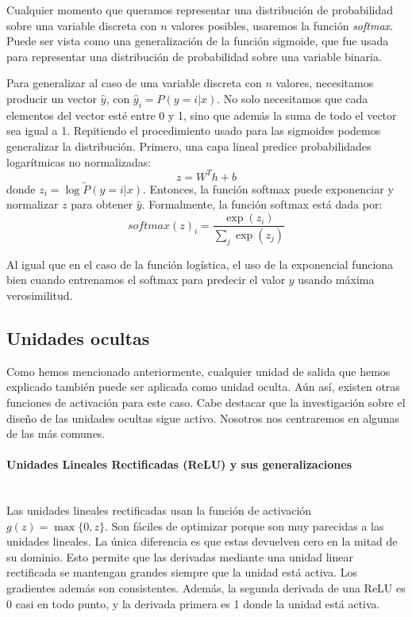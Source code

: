 Cualquier momento que queramos representar una distribución de probabilidad sobre una variable discreta con $n$ valores posibles, usaremos la función \textit{softmax}. Puede ser vista como una generalización de la función sigmoide, que fue usada para representar una distribución de probabilidad sobre una variable binaria.

Para generalizar al caso de una variable discreta con $n$ valores, necesitamos producir un vector $\hat{y}$, con $\hat{y}_i=P(y=i|x)$. No solo necesitamos que cada elementos del vector esté entre 0 y 1, sino que además la suma de todo el vector sea igual a 1. Repitiendo el procedimiento usado para las sigmoides podemos generalizar la distribución. Primero, una capa lineal predice probabilidades logarítmicas no normalizadas:
\begin{equation}
    z = W^Th+b
\end{equation}
donde $z_i = \log \tilde{P}(y=i|x)$. Entonces, la función softmax puede exponenciar y normalizar $z$ para obtener $\hat{y}$. Formalmente, la función softmax está dada por: 
\begin{equation}
    softmax(z)_i=\frac{\exp{(z_i)}}{\sum_j \exp{(z_j)}}
\end{equation}

Al igual que en el caso de la función logística, el uso de la exponencial funciona bien cuando entrenamos el softmax para predecir el valor $y$ usando máxima verosimilitud.

\subsection{Unidades ocultas}
Como hemos mencionado anteriormente, cualquier unidad de salida que hemos explicado también puede ser aplicada como unidad oculta. Aún así, existen otras funciones de activación para este caso. Cabe destacar que la investigación sobre el diseño de las unidades ocultas sigue activo. Nosotros nos centraremos en algunas de las más comunes.

\paragraph{Unidades Lineales Rectificadas (ReLU) y sus generalizaciones}\mbox{}\\
Las unidades lineales rectificadas usan la función de activación $g(z)=\max \{0, z\}$. Son fáciles de optimizar porque son muy parecidas a las unidades lineales. La única diferencia es que estas devuelven cero en la mitad de su dominio. Esto permite que las derivadas mediante una unidad linear rectificada se mantengan grandes siempre que la unidad está activa. Los gradientes además son consistentes. Además, la segunda derivada de una ReLU es 0 casi en todo punto, y la derivada primera es 1 donde la unidad está activa.

